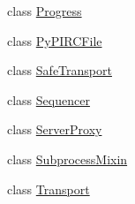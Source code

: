 \begin{DoxyCompactItemize}
class \hyperlink{classpip_1_1__vendor_1_1distlib_1_1util_1_1Progress}{Progress}
\item 
class \hyperlink{classpip_1_1__vendor_1_1distlib_1_1util_1_1PyPIRCFile}{Py\+P\+I\+R\+C\+File}
\item 
class \hyperlink{classpip_1_1__vendor_1_1distlib_1_1util_1_1SafeTransport}{Safe\+Transport}
\item 
class \hyperlink{classpip_1_1__vendor_1_1distlib_1_1util_1_1Sequencer}{Sequencer}
\item 
class \hyperlink{classpip_1_1__vendor_1_1distlib_1_1util_1_1ServerProxy}{Server\+Proxy}
\item 
class \hyperlink{classpip_1_1__vendor_1_1distlib_1_1util_1_1SubprocessMixin}{Subprocess\+Mixin}
\item 
class \hyperlink{classpip_1_1__vendor_1_1distlib_1_1util_1_1Transport}{Transport}
\end{DoxyCompactItemize}
